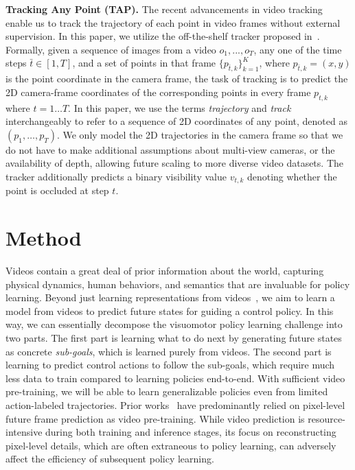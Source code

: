 \noindent \textbf{Tracking Any Point (TAP).} The recent advancements in video tracking~\cite{harley2022particle, doersch2023tapvid, doersch2023tapir, wang2023tracking, zheng2023pointodyssey} enable us to track the trajectory of each point in video frames without external supervision. In this paper, we utilize the off-the-shelf tracker proposed in~\cite{karaev2023cotracker}. Formally, given a sequence of images from a video $o_1, ..., o_T$, any one of the time steps $\bar{t} \in [1, T]$, and a set of points in that frame $\{p_{\bar{t}, k}\}_{k=1}^{K}$, where $p_{\bar{t}, k} = (x, y)$ is the point coordinate in the camera frame, the task of tracking is to predict the 2D camera-frame coordinates of the corresponding points in every frame $p_{t, k}$ where $t =1 \dots T$. In this paper, we use the terms \textit{trajectory} and \textit{track} interchangeably to refer to a sequence of 2D coordinates of any point, denoted as $(p_1, \dots, p_T)$. We only model the 2D trajectories in the camera frame so that we do not have to make additional assumptions about multi-view cameras, or the availability of depth, allowing future scaling to more diverse video datasets. The tracker additionally predicts a binary visibility value $v_{t, k}$ denoting whether the point is occluded at step $t$.

\section{Method}
Videos contain a great deal of prior information about the world, capturing physical dynamics, human behaviors, and semantics that are invaluable for policy learning. Beyond just learning representations from videos~\cite{sermanet2017tcn,nair2023r3m,ma2023vip}, we aim to learn a model from videos to predict future states for guiding a control policy. In this way, we can essentially decompose the visuomotor policy learning challenge into two parts. The first part is learning what to do next by generating future states as concrete \textit{sub-goals}, which is learned purely from videos. The second part is learning to predict control actions to follow the sub-goals, which require much less data to train compared to learning policies end-to-end. With sufficient video pre-training, we will be able to learn generalizable policies even from limited action-labeled trajectories. Prior works~\cite{du2023unipi,Ko2023Learning,black2023zero} have predominantly relied on pixel-level future frame prediction as video pre-training. While video prediction is resource-intensive during both training and inference stages, its focus on reconstructing pixel-level details, which are often extraneous to policy learning, can adversely affect the efficiency of subsequent policy learning.

